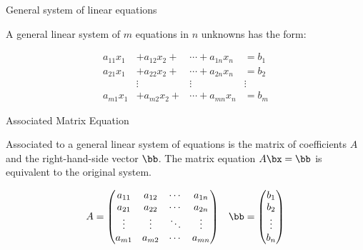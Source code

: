 \documentclass[handout]{beamer}
\begin{document}

\begin{frame}{General system of linear equations}

A general linear system of $m$ equations in $n$ unknowns has the form:

\begin{align*}
 a_{11}x_1 &+ a_{12}x_2 + &\cdots + a_{1n} x_n &= b_1\\
 a_{21}x_1 &+ a_{22}x_2 + &\cdots + a_{2n} x_n &= b_2\\
 \quad &{ \vdots \quad} \quad &{ \vdots \quad} \quad  &{ \vdots \quad} \quad\\
 a_{m1}x_1 &+ a_{m2}x_2 + &\cdots + a_{mn} x_n &= b_m
\end{align*}

\end{frame}


\begin{frame}{Associated Matrix Equation}

Associated to a general linear system of equations is the matrix of coefficients
$A$ and the right-hand-side vector $\bb$. The
matrix equation $A\bx = \bb$ is equivalent to the original system.

$$
\begin{matrix}
A =
\begin{pmatrix}
a_{11} & a_{12} & \cdots & a_{1n} \\
a_{21} & a_{22} & \cdots & a_{2n} \\
\vdots & \vdots & \ddots & \vdots \\
a_{m1} & a_{m2} & \cdots & a_{mn}
\end{pmatrix}
&
\bb =
\begin{pmatrix}
b_1 \\ b_2 \\ \vdots \\ b_n
\end{pmatrix}
\end{matrix}
$$


\end{frame}

\end{document}
